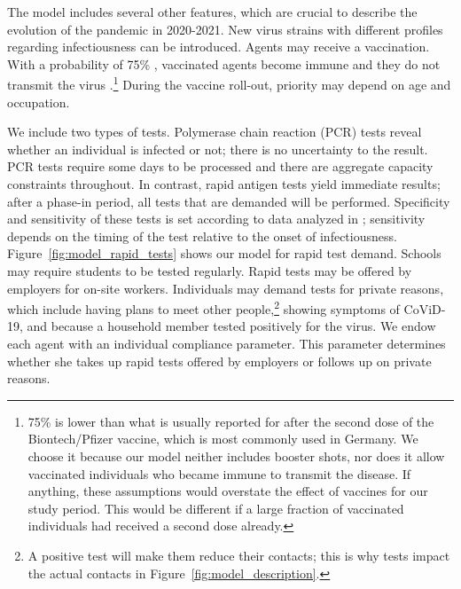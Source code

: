 The model includes several other features, which are crucial to describe the evolution
of the pandemic in 2020-2021. New virus strains with different profiles regarding
infectiousness can be introduced. Agents may receive a vaccination. With a probability
of 75\% \citep{Hunter2021}, vaccinated agents become immune and they do not transmit the
virus \citep{Petter2021, LevineTiefenbrun2021, Pritchard2021}.\footnote{75\% is lower
than what is usually reported for after the second dose of the Biontech/Pfizer vaccine,
which is most commonly used in Germany. We choose it because our model neither includes
booster shots, nor does it allow vaccinated individuals who became immune to transmit
the disease\citep{Petter2021, LevineTiefenbrun2021, Pritchard2021}. If anything, these
assumptions would overstate the effect of vaccines for our study period. This would be
different if a large fraction of vaccinated individuals had received a second dose
already.} During the vaccine roll-out, priority may depend on age and occupation.

We include two types of tests. Polymerase chain reaction (PCR) tests reveal whether an
individual is infected or not; there is no uncertainty to the result. PCR tests require
some days to be processed and there are aggregate capacity constraints throughout. In
contrast, rapid antigen tests yield immediate results; after a phase-in period, all
tests that are demanded will be performed. Specificity and sensitivity of these tests is
set according to data analyzed in \cite{Bruemmer2021, Smith2021}; sensitivity depends on
the timing of the test relative to the onset of infectiousness.
Figure~\ref{fig:model_rapid_tests} shows our model for rapid test demand. Schools may
require students to be tested regularly. Rapid tests may be offered by employers for
on-site workers. Individuals may demand tests for private reasons, which include having
plans to meet other people,\footnote{A positive test will make them reduce their
contacts; this is why tests impact the actual contacts in
Figure~\ref{fig:model_description}.} showing symptoms of CoViD-19, and because a
household member tested positively for the virus. We endow each agent with an individual
compliance parameter. This parameter determines whether she takes up rapid tests offered
by employers or follows up on private reasons.

